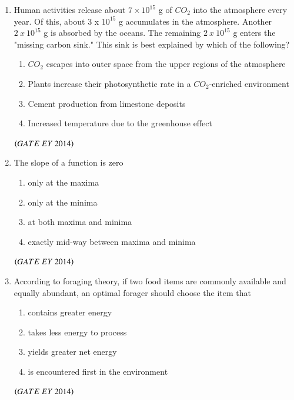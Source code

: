 \documentclass[journal]{IEEEtran}
\numberwithin{equation}{enumi}
\numberwithin{figure}{enumi}
\begin{document}
\begin{enumerate}
    \item Human activities release about $7\times10^{15}$ g of $CO_{2}$ into the atmosphere every year. Of this, about 3 x $10^{15}$ g accumulates in the atmosphere. Another $2~x~10^{15}$ g is absorbed by the oceans. The remaining $2~x~10^{15}$ g enters the "missing carbon sink." This sink is best explained by which of the following?
    \begin{enumerate}
        \item $CO_{2}$ escapes into outer space from the upper regions of the atmosphere
        \item Plants increase their photosynthetic rate in a $CO_{2}$-enriched environment
        \item Cement production from limestone deposits
        \item Increased temperature due to the greenhouse effect
    \end{enumerate}
    \hfill{$\brak{ GATE\ EY\ 2014}$}
    \bigskip
    
    \item The slope of a function is zero
    \begin{multicols}{2}
    \begin{enumerate}
        \item only at the maxima
        \item only at the minima\\
        \item at both maxima and minima
        \item exactly mid-way between maxima and minima
    \end{enumerate}
    \end{multicols}
    \hfill{$\brak{ GATE\ EY\ 2014}$}
    \bigskip

    \item According to foraging theory, if two food items are commonly available and equally abundant, an optimal forager should choose the item that
    \begin{multicols}{2}
    \begin{enumerate}
        \item contains greater energy
        \item takes less energy to process
        \item yields greater net energy
        \item is encountered first in the environment
    \end{enumerate}
    \end{multicols}
    \hfill{$\brak{ GATE\ EY\ 2014}$}
    \bigskip
    

\end{enumerate}
\end{document}
